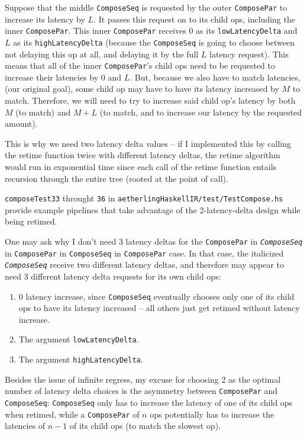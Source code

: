 \documentclass[12pt]{article}
\begin{document}
Suppose that the middle \texttt{ComposeSeq} is requested by the outer
\texttt{ComposePar} to increase its latency by $L$. It passes this
request on to its child ops, including the inner \texttt{ComposePar}.
This inner \texttt{ComposePar} receives 0 as its
\texttt{lowLatencyDelta} and $L$ as its \texttt{highLatencyDelta}
(because the \texttt{ComposeSeq} is going to choose between not
delaying this op at all, and delaying it by the full $L$ latency
request). This means that all of the inner \texttt{ComposePar}'s child
ops need to be requested to increase their latencies by 0 and
$L$. But, because we also have to match latencies, (our original
goal), some child op may have to have its latency increased by $M$ to
match. Therefore, we will need to try to increase said child op's
latency by both $M$ (to match) and $M+L$ (to match, and to increase
our latency by the requested amount).

This is why we need two latency delta values -- if I implemented this
by calling the retime function twice with different latency deltas,
the retime algorithm would run in exponential time since each call of
the retime function entails recursion through the entire tree (rooted
at the point of call).

\texttt{composeTest33} throught \texttt{36} in
\texttt{aetherlingHaskellIR/test/TestCompose.hs} provide example
pipelines that take advantage of the 2-latency-delta design
while being retimed.

One may ask why I don't need 3 latency deltas for the
\texttt{ComposePar} in \textit{\texttt{ComposeSeq}} in \texttt{ComposePar} in
\texttt{ComposeSeq} in \texttt{ComposePar} case. In that case, the
italicized \textit{\texttt{ComposeSeq}} receive two different latency deltas, and
therefore may appear to need 3 different latency delta requests for its own
child ops:
\begin{enumerate}
\item 0 latency increase, since \texttt{ComposeSeq} eventually chooses
  only one of its child ops to have its latency increased -- all others
  just get retimed without latency increase.
\item The argument \texttt{lowLatencyDelta}.
\item The argument \texttt{highLatencyDelta}.
\end{enumerate}

Besides the issue of infinite regress, my excuse for choosing 2 as the
optimal number of latency delta choices is the asymmetry between
\texttt{ComposePar} and \texttt{ComposeSeq}: \texttt{ComposeSeq} only
has to increase the latency of one of its child ops when retimed,
while a \texttt{ComposePar} of $n$ ops potentially has to increase
the latencies of $n-1$ of its child ops (to match the slowest op).
\end{document}
